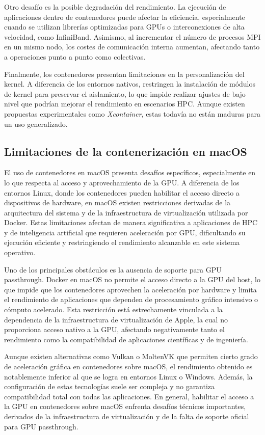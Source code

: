 Otro desafío es la posible degradación del rendimiento. La ejecución de aplicaciones dentro de contenedores puede afectar la eficiencia, especialmente cuando se utilizan librerías optimizadas para GPUs o interconexiones de alta velocidad, como InfiniBand. Asimismo, al incrementar el número de procesos MPI en un mismo nodo, los costes de comunicación interna aumentan, afectando tanto a operaciones punto a punto como colectivas.

Finalmente, los contenedores presentan limitaciones en la personalización del kernel. A diferencia de los entornos nativos, restringen la instalación de módulos de kernel para preservar el aislamiento, lo que impide realizar ajustes de bajo nivel que podrían mejorar el rendimiento en escenarios HPC. Aunque existen propuestas experimentales como \textit{Xcontainer}, estas todavía no están maduras para un uso generalizado.

\subsection{Limitaciones de la contenerización en macOS}

El uso de contenedores en macOS presenta desafíos específicos, especialmente en lo que respecta al acceso y aprovechamiento de la GPU. A diferencia de los entornos Linux, donde los contenedores pueden habilitar el acceso directo a dispositivos de hardware, en macOS existen restricciones derivadas de la arquitectura del sistema y de la infraestructura de virtualización utilizada por Docker. Estas limitaciones afectan de manera significativa a aplicaciones de HPC y de inteligencia artificial que requieren aceleración por GPU, dificultando su ejecución eficiente y restringiendo el rendimiento alcanzable en este sistema operativo.

Uno de los principales obstáculos es la ausencia de soporte para GPU passthrough. Docker en macOS no permite el acceso directo a la GPU del host, lo que impide que los contenedores aprovechen la aceleración por hardware y limita el rendimiento de aplicaciones que dependen de procesamiento gráfico intensivo o cómputo acelerado. Esta restricción está estrechamente vinculada a la dependencia de la infraestructura de virtualización de Apple, la cual no proporciona acceso nativo a la GPU, afectando negativamente tanto el rendimiento como la compatibilidad de aplicaciones científicas y de ingeniería.

Aunque existen alternativas como Vulkan o MoltenVK que permiten cierto grado de aceleración gráfica en contenedores sobre macOS, el rendimiento obtenido es notablemente inferior al que se logra en entornos Linux o Windows. Además, la configuración de estas tecnologías suele ser compleja y no garantiza compatibilidad total con todas las aplicaciones. En general, habilitar el acceso a la GPU en contenedores sobre macOS enfrenta desafíos técnicos importantes, derivados de la infraestructura de virtualización y de la falta de soporte oficial para GPU passthrough.

